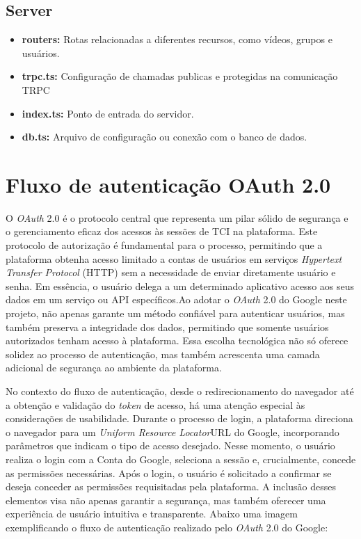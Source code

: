 \subsection{Server}
\label{server}
\begin{itemize}
\item \textbf{routers:} Rotas relacionadas a diferentes recursos, como vídeos, grupos e usuários.
\item \textbf{trpc.ts:} Configuração de chamadas publicas e protegidas na comunicação TRPC
\item \textbf{index.ts:} Ponto de entrada do servidor.
\item \textbf{db.ts:} Arquivo de configuração ou conexão com o banco de dados.
\end{itemize}


\section{Fluxo de autenticação OAuth 2.0}
O \textit{OAuth} 2.0 é o protocolo central que representa um pilar sólido de segurança e o gerenciamento eficaz dos acessos às sessões de TCI na plataforma. Este protocolo de autorização é fundamental para o processo, permitindo que a plataforma obtenha acesso limitado a contas de usuários em serviços \textit{Hypertext Transfer Protocol} (HTTP) sem a necessidade de enviar diretamente usuário e senha. Em essência, o usuário delega a um determinado aplicativo acesso aos seus dados em um serviço ou API específicos.\cite{OAUTH}Ao adotar o \textit{OAuth} 2.0 do Google neste projeto, não apenas garante um método confiável para autenticar usuários, mas também preserva a integridade dos dados, permitindo que somente usuários autorizados tenham acesso à plataforma. Essa escolha tecnológica não só oferece solidez ao processo de autenticação, mas também acrescenta uma camada adicional de segurança ao ambiente da plataforma.

No contexto do fluxo de autenticação, desde o redirecionamento do navegador até a obtenção e validação do \textit{token} de acesso, há uma atenção especial às considerações de usabilidade. Durante o processo de login, a plataforma direciona o navegador para um \textit{Uniform Resource Locator}URL do Google, incorporando parâmetros que indicam o tipo de acesso desejado. Nesse momento, o usuário realiza o login com a Conta do Google, seleciona a sessão e, crucialmente, concede as permissões necessárias. Após o login, o usuário é solicitado a confirmar se deseja conceder as permissões requisitadas pela plataforma. A inclusão desses elementos visa não apenas garantir a segurança, mas também oferecer uma experiência de usuário intuitiva e transparente. Abaixo uma imagem exemplificando o fluxo de autenticação realizado pelo \textit{OAuth} 2.0 do Google\cite{OAUTHACESS}:

